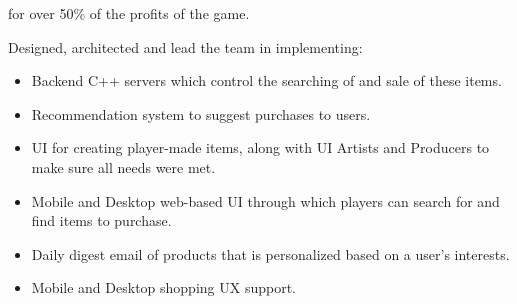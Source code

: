 \documentclass{article}
\begin{document}
for over 50\% of the profits of the game.
\par
\vspace{\baselineskip}
Designed, architected and lead the team in implementing: 
\begin{small}
\begin{itemize}
  \item Backend C++ servers which control the searching of and sale of these items.
  \item Recommendation system to suggest purchases to users.
  \item UI for creating player-made items, along with UI Artists  and Producers to make sure all needs were met.
  \item Mobile and Desktop web-based UI through which players can search for and find items to purchase.  
  \item Daily digest email of products that is personalized based on a user's interests.
  \item Mobile and Desktop shopping UX support.
\end{itemize}
\end{small}
\end{document}
